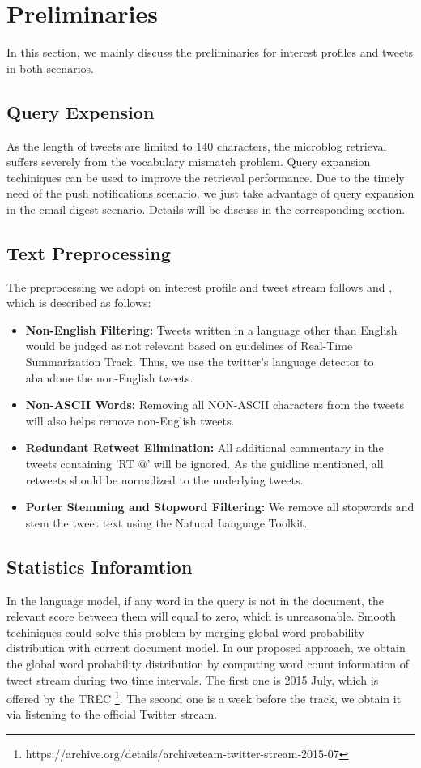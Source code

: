 \section{Preliminaries}
In this section, we mainly discuss the preliminaries for interest profiles and tweets in both scenarios.

\subsection{Query Expension}
As the length of tweets are limited to $140$ characters, the microblog retrieval
suffers severely from the vocabulary mismatch problem.
Query expansion techiniques can be used to improve the retrieval performance.
Due to the timely need of the push notifications scenario,
we just take advantage of query expansion in the email digest scenario.
Details will be discuss in the corresponding section.

\subsection{Text Preprocessing}
The preprocessing we adopt on interest profile and tweet stream follows \cite{qiangpkuicst} and \cite{lvpkuicst},
which is described as follows:
\begin{itemize}
\item \textbf{Non-English Filtering:} Tweets written in a language other than English would be judged as not relevant based on guidelines of Real-Time Summarization Track. Thus, we use the twitter's language detector to abandone the non-English tweets.
\item \textbf{Non-ASCII Words:} Removing all NON-ASCII characters from the tweets will also helps remove non-English tweets.
\item \textbf{Redundant Retweet Elimination:} All additional commentary in the tweets containing 'RT @' will be ignored. As the guidline mentioned, all retweets should be normalized to the underlying tweets.
\item \textbf{Porter Stemming and Stopword Filtering:} We remove all stopwords and stem the tweet text using the Natural Language Toolkit.
\end{itemize}

\subsection{Statistics Inforamtion}
In the language model, if any word in the query is not in the document,
the relevant score between them will equal to zero, which is unreasonable.
Smooth techiniques could solve this problem by merging global word
probability distribution with current document model.
In our proposed approach, we obtain the global word probability distribution
by computing word count information of tweet stream during two time intervals.
The first one is 2015 July, which is offered by the TREC
\footnote{https://archive.org/details/archiveteam-twitter-stream-2015-07}.
The second one is a week before the track, we obtain it via listening to
the official Twitter stream.
